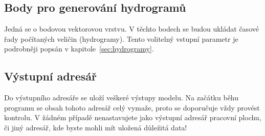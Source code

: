 












\subsection{Body pro generování hydrogramů} \label{sec:vstupbody}

Jedná  se o bodovou vektorovou vrstvu. V těchto bodech se budou ukládat časové řady počítaných veličin (hydrogramy). Tento volitelný vstupní parametr je podrobněji popsán v kapitole~\ref{sec:hydrogramy}.











\subsection{Výstupní adresář} \label{sec:vstupadresar}
Do výstupního adresáře se uloží veškeré výstupy modelu. Na začátku běhu programu se obsah tohoto adresář celý vymaže, proto se doporučuje vždy provést kontrolu. V žádném případě nenastavujete jako výstupní adresář pracovní plochu, či jiný adresář, kde byste mohli mít uložená důležitá data!











% 
% 
% 
% 
% 







